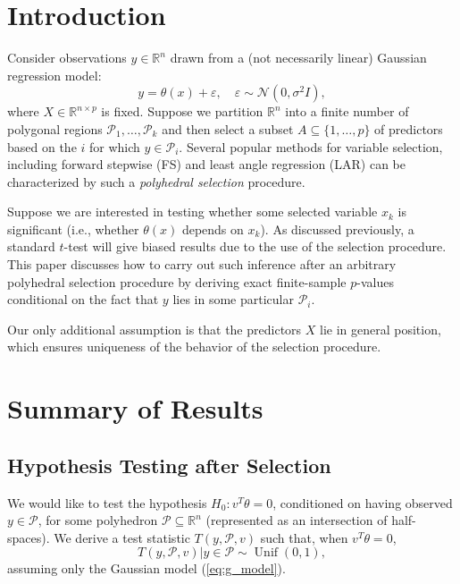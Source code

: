 \documentclass{article}
\newcommand{\R}{\mathbb{R}}                         %
\newcommand{\e}{\varepsilon}                        %
\newcommand{\poly}{\mathcal{P}}
\newcommand{\Unif}{\operatorname{Unif}}             %
\begin{document}
\section{Introduction}
Consider observations $y \in \R^n$ drawn from a (not necessarily linear)
Gaussian regression model:
\begin{equation}
y = \theta(x) + \e, \quad \e \sim \mathcal{N}(0,\sigma^2 I),
\label{eq:g_model}
\end{equation}
where $X \in \R^{n \times p}$ is fixed. Suppose we partition $\R^n$ into
a finite number of polygonal regions $\poly_1,\dots,\poly_k$ and then select a
subset $A \subseteq \{1,\dots,p\}$ of predictors based on the $i$ for which
$y \in \poly_i$. Several popular methods for variable selection, including
forward stepwise (FS) and least angle regression (LAR) can be characterized by
such a \emph{polyhedral selection} procedure.

Suppose we are interested in testing whether some selected variable $x_k$ is
significant (i.e., whether $\theta(x)$ depends on $x_k$). As discussed
previously, a standard $t$-test will give biased results due to the use of the
selection procedure. This paper discusses how to carry out such inference after
an arbitrary polyhedral selection procedure by deriving exact finite-sample
$p$-values conditional on the fact that $y$ lies in some particular $\poly_i$.

Our only additional assumption is that the predictors $X$ lie in general
position, which ensures uniqueness of the behavior of the selection procedure.

\section{Summary of Results}
\subsection{Hypothesis Testing after Selection}
We would like to test the hypothesis $H_0 : v^T \theta = 0$, conditioned on
having observed $y \in \poly$, for some polyhedron $\poly \subseteq \R^n$
(represented as an intersection of half-spaces). We derive a test statistic
$T(y,\poly,v)$ such that, when $v^T \theta = 0$,
\[T(y,\poly,v) | y \in \poly \sim \Unif(0,1),\]
assuming only the Gaussian model (\ref{eq:g_model}).
\end{document}
